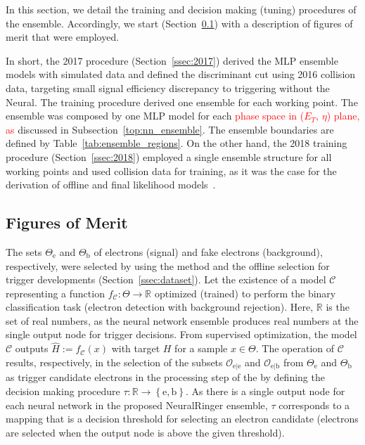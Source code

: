 In this section, we detail the training and decision making (tuning) procedures
of the \rnn ensemble. Accordingly, we start (Section~\ref{ssec:fom}) with a
description of figures of merit that were employed.

In short, the 2017 procedure (Section~\ref{ssec:2017}) derived the MLP ensemble
models with simulated data and defined the discriminant cut using
2016 collision data, targeting small signal efficiency discrepancy to triggering 
without the Neural\rnn. The training procedure derived one ensemble for each working
point. The ensemble was composed by one MLP model for each \textcolor{red}{phase space in ($E_T$, $\eta$) plane, as} discussed 
in Subsection~\ref{top:nn_ensemble}. The ensemble boundaries are defined by Table~\ref{tab:ensemble_regions}. On the other hand, the 2018 training procedure (Section~\ref{ssec:2018})
employed a single ensemble structure for all working points and used
collision data for training, as it was the case for the derivation of offline
and final \hlt likelihood models~\cite{aaboud2019electron}.



\subsection{Figures of Merit}\label{ssec:fom}



The sets $\Theta_{\text{e}}$ and $\Theta_{\text{b}}$ of electrons (signal) and fake electrons (background), respectively, were selected by using the \tnp{} method and the offline selection for trigger developments (Section~\ref{ssec:dataset}). Let the existence of a model $\mathcal{C}$ representing a function $f_{\mathcal{C}} : \Theta \rightarrow \mathbb{R}$ optimized (trained) to perform the binary classification task (electron detection with background rejection). Here, $\mathbb{R}$ is the set of real numbers, as the neural network ensemble produces real numbers at the single output node for trigger decisions.  From supervised optimization, the model $\mathcal{C}$ outputs $\hat{H}:=f_{\mathcal{C}}(x)$ with target $H$ for a sample $x \in \Theta$. The operation of $\mathcal{C}$ results, respectively, in the selection of the subsets $\mathcal{O}_{\text{e}|\text{e}}$ and $\mathcal{O}_{\text{e}|\text{b}}$ from $\Theta_{\text{e}}$ and $\Theta_{\text{b}}$ as trigger candidate electrons in the \fastcalo{} processing step of the \hlt{} by defining the decision making procedure $\tau : \mathbb{R} \rightarrow \left\{\text{e},\text{b}\right\}$. As there is a single output node for each neural network in the proposed NeuralRinger ensemble, $\tau$ corresponds to a mapping that is a decision threshold for selecting an electron candidate (electrons are selected when the output node is above the given threshold).  


